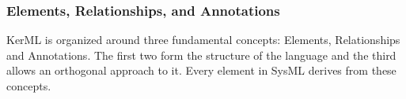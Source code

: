 


\subsubsection{Elements, Relationships, and Annotations}
KerML is organized around three fundamental concepts: Elements, Relationships and Annotations. The first two form the structure of the language and the third allows an orthogonal approach to it. Every element in SysML derives from these concepts.

